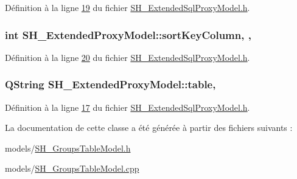 Définition à la ligne \hyperlink{SH__ExtendedSqlProxyModel_8h_source_l00019}{19} du fichier \hyperlink{SH__ExtendedSqlProxyModel_8h_source}{S\-H\-\_\-\-Extended\-Sql\-Proxy\-Model.\-h}.

\hypertarget{classSH__ExtendedProxyModel_a47e2d0b99b84fb066438db667dd1ad26}{
\subsubsection[{sort\-Key\-Column}]{\setlength{\rightskip}{0pt plus 5cm}int S\-H\-\_\-\-Extended\-Proxy\-Model\-::sort\-Key\-Column\hspace{0.3cm}{\ttfamily [read]}, {\ttfamily [write]}, {\ttfamily [inherited]}}}\label{classSH__ExtendedProxyModel_a47e2d0b99b84fb066438db667dd1ad26}


Définition à la ligne \hyperlink{SH__ExtendedSqlProxyModel_8h_source_l00020}{20} du fichier \hyperlink{SH__ExtendedSqlProxyModel_8h_source}{S\-H\-\_\-\-Extended\-Sql\-Proxy\-Model.\-h}.

\hypertarget{classSH__ExtendedProxyModel_a7eef4557a77444e9ce5c24c180392bfa}{
\subsubsection[{table}]{\setlength{\rightskip}{0pt plus 5cm}Q\-String S\-H\-\_\-\-Extended\-Proxy\-Model\-::table\hspace{0.3cm}{\ttfamily [read]}, {\ttfamily [inherited]}}}\label{classSH__ExtendedProxyModel_a7eef4557a77444e9ce5c24c180392bfa}


Définition à la ligne \hyperlink{SH__ExtendedSqlProxyModel_8h_source_l00017}{17} du fichier \hyperlink{SH__ExtendedSqlProxyModel_8h_source}{S\-H\-\_\-\-Extended\-Sql\-Proxy\-Model.\-h}.



La documentation de cette classe a été générée à partir des fichiers suivants \-:\begin{DoxyCompactItemize}
\item 
models/\hyperlink{SH__GroupsTableModel_8h}{S\-H\-\_\-\-Groups\-Table\-Model.\-h}\item 
models/\hyperlink{SH__GroupsTableModel_8cpp}{S\-H\-\_\-\-Groups\-Table\-Model.\-cpp}\end{DoxyCompactItemize}
